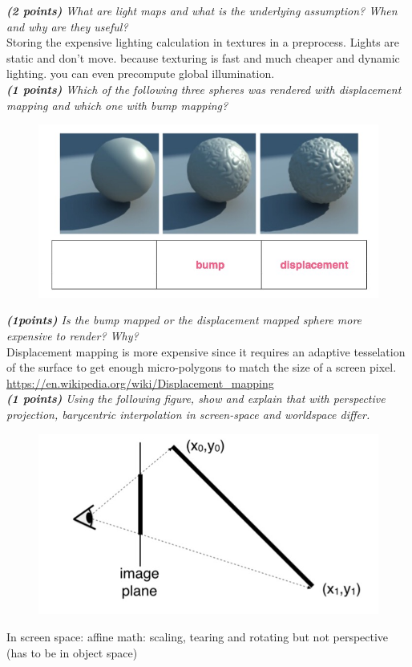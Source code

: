 \documentclass[a4paper,10pt]{article}
\begin{document}
\textit{\textbf{(2 points)} What are light maps and what is the underlying assumption? When and why are they useful?}\\

Storing the expensive lighting calculation in textures in a preprocess. Lights are static and don’t move. because texturing is fast and much cheaper and dynamic lighting. you can even precompute global illumination.\\

\textit{\textbf{(1 points)} Which of the following three spheres was rendered with displacement
mapping and which one with bump mapping?}
\begin{figure}[H]
	\centering
	\includegraphics[width=.5\textwidth]{3-2-bump}
\end{figure}
\textit{\textbf{(1points) }Is the bump mapped or the displacement mapped sphere more expensive to render? Why?}\\

Displacement mapping is more expensive since it requires an adaptive tesselation
of the surface to get enough micro-polygons to match the size of a screen pixel.\\

\url{https://en.wikipedia.org/wiki/Displacement_mapping}\\

\textit{\textbf{(1 points)} Using the following figure, show and explain that with perspective projection, barycentric interpolation in screen-space and worldspace differ.
}\\
\begin{figure}[H]
	\centering
	\includegraphics[width=.5\textwidth]{3-2-perspective}
\end{figure}

In screen space: affine math: scaling, tearing and rotating but not perspective (has to be in object space)\\
\end{document}
